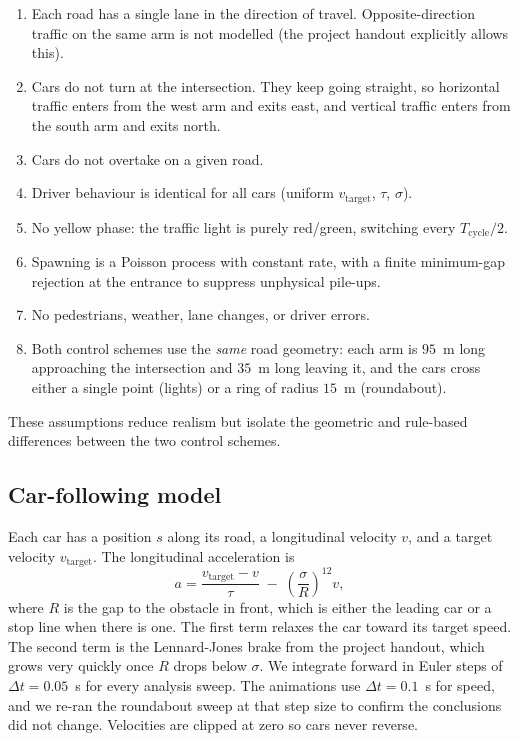 \documentclass[11pt]{article}
\begin{document}
\begin{enumerate}
    \item Each road has a single lane in the direction of travel. Opposite-direction traffic on the same arm is not modelled (the project handout explicitly allows this).
    \item Cars do not turn at the intersection. They keep going straight, so horizontal traffic enters from the west arm and exits east, and vertical traffic enters from the south arm and exits north.
    \item Cars do not overtake on a given road.
    \item Driver behaviour is identical for all cars (uniform $v_{\text{target}}$, $\tau$, $\sigma$).
    \item No yellow phase: the traffic light is purely red/green, switching every $T_{\text{cycle}}/2$.
    \item Spawning is a Poisson process with constant rate, with a finite minimum-gap rejection at the entrance to suppress unphysical pile-ups.
    \item No pedestrians, weather, lane changes, or driver errors.
    \item Both control schemes use the \emph{same} road geometry: each arm is $95$~m long approaching the intersection and $35$~m long leaving it, and the cars cross either a single point (lights) or a ring of radius $15$~m (roundabout).
\end{enumerate}

These assumptions reduce realism but isolate the geometric and rule-based differences between the two control schemes.

\subsection{Car-following model}
Each car has a position $s$ along its road, a longitudinal velocity $v$, and a target velocity $v_{\text{target}}$. The longitudinal acceleration is
\begin{equation}
    a = \frac{v_{\text{target}} - v}{\tau} \;-\; \left(\frac{\sigma}{R}\right)^{12} v ,
    \label{eq:lj}
\end{equation}
where $R$ is the gap to the obstacle in front, which is either the leading car or a stop line when there is one. The first term relaxes the car toward its target speed. The second term is the Lennard-Jones brake from the project handout, which grows very quickly once $R$ drops below $\sigma$. We integrate forward in Euler steps of $\Delta t = 0.05$~s for every analysis sweep. The animations use $\Delta t = 0.1$~s for speed, and we re-ran the roundabout sweep at that step size to confirm the conclusions did not change. Velocities are clipped at zero so cars never reverse.
\end{document}

